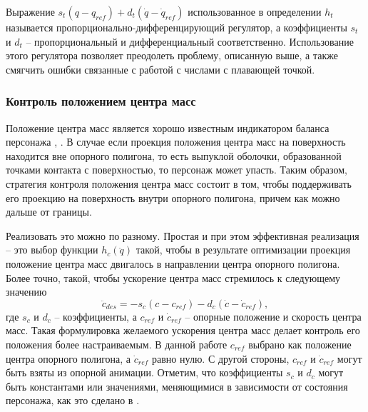 Выражение $s_{t} (q - q_{ref}) + d_{t} (\dot{q} - \dot{q}_{ref})$ использованное в определении $h_{t}$ называется \break пропорционально-дифференцирующий регулятор, а коэффициенты $s_{t}$ и $d_{t}$ -- пропорциональный и дифференциальный соответственно. Использование этого регулятора позволяет преодолеть проблему, описанную выше, а также смягчить ошибки связанные с работой с числами с плавающей точкой.


\subsubsection{Контроль положением центра масс}

Положение центра масс является хорошо известным индикатором баланса персонажа \cite{MacchiettoZS}, \cite{AbeSP}. В случае если проекция положения центра масс на поверхность находится вне опорного полигона, то есть выпуклой оболочки, образованной точками контакта с поверхностью, то персонаж может упасть. Таким образом, стратегия контроля положения центра масс состоит в том, чтобы поддерживать его проекцию на поверхность внутри опорного полигона, причем как можно дальше от границы.

Реализовать это можно по разному. Простая и при этом эффективная реализация -- это выбор функции $h_c(\ddot{q})$ такой, чтобы в результате оптимизации проекция положение центра масс двигалось в направлении центра опорного полигона. Более точно, такой, чтобы ускорение центра масс стремилось к следующему значению
\begin{equation*}
  \ddot{c}_{des} = - s_{c} (c - c_{ref}) - d_{c} (\dot{c} - \dot{c}_{ref}), \tag{2.6}\label{eq:2.6}
\end{equation*}
где $s_{c}$ и $d_{c}$ -- коэффициенты, а $c_{ref}$ и $\dot{c}_{ref}$ -- опорные положение и скорость центра масс. Такая формулировка желаемого ускорения центра масс делает контроль его положения более настраиваемым. В данной работе $c_{ref}$ выбрано как положение центра опорного полигона, а $\dot{c}_{ref}$ равно нулю. С другой стороны, $c_{ref}$ и $\dot{c}_{ref}$ могут быть взяты из опорной анимации. Отметим, что коэффициенты $s_{c}$ и $d_{c}$ могут быть константами или значениями, меняющимися в зависимости от состояния персонажа, как это сделано в \cite{AbeSP}.


